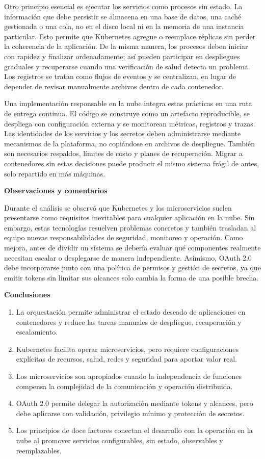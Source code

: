 \documentclass[12pt,letterpaper]{article}
\begin{document}
Otro principio esencial es ejecutar los servicios como procesos sin estado. La información que debe persistir se almacena en una base de datos, una caché gestionada o una cola, no en el disco local ni en la memoria de una instancia particular. Esto permite que Kubernetes agregue o reemplace réplicas sin perder la coherencia de la aplicación. De la misma manera, los procesos deben iniciar con rapidez y finalizar ordenadamente; así pueden participar en despliegues graduales y recuperarse cuando una verificación de salud detecta un problema. Los registros se tratan como flujos de eventos y se centralizan, en lugar de depender de revisar manualmente archivos dentro de cada contenedor.

Una implementación responsable en la nube integra estas prácticas en una ruta de entrega continua. El código se construye como un artefacto reproducible, se despliega con configuración externa y se monitorean métricas, registros y trazas. Las identidades de los servicios y los secretos deben administrarse mediante mecanismos de la plataforma, no copiándose en archivos de despliegue. También son necesarios respaldos, límites de costo y planes de recuperación. Migrar a contenedores sin estas decisiones puede producir el mismo sistema frágil de antes, solo repartido en más máquinas.

\textbf{Observaciones y comentarios}

Durante el análisis se observó que Kubernetes y los microservicios suelen presentarse como requisitos inevitables para cualquier aplicación en la nube. Sin embargo, estas tecnologías resuelven problemas concretos y también trasladan al equipo nuevas responsabilidades de seguridad, monitoreo y operación. Como mejora, antes de dividir un sistema se debería evaluar qué componentes realmente necesitan escalar o desplegarse de manera independiente. Asimismo, OAuth 2.0 debe incorporarse junto con una política de permisos y gestión de secretos, ya que emitir tokens sin limitar sus alcances solo cambia la forma de una posible brecha.

\textbf{Conclusiones}

\begin{enumerate}[label=\arabic*., leftmargin=*, itemsep=1pt]
    \item La orquestación permite administrar el estado deseado de aplicaciones en contenedores y reduce las tareas manuales de despliegue, recuperación y escalamiento.
    \item Kubernetes facilita operar microservicios, pero requiere configuraciones explícitas de recursos, salud, redes y seguridad para aportar valor real.
    \item Los microservicios son apropiados cuando la independencia de funciones compensa la complejidad de la comunicación y operación distribuida.
    \item OAuth 2.0 permite delegar la autorización mediante tokens y alcances, pero debe aplicarse con validación, privilegio mínimo y protección de secretos.
    \item Los principios de doce factores conectan el desarrollo con la operación en la nube al promover servicios configurables, sin estado, observables y reemplazables.
\end{enumerate}
\end{document}
